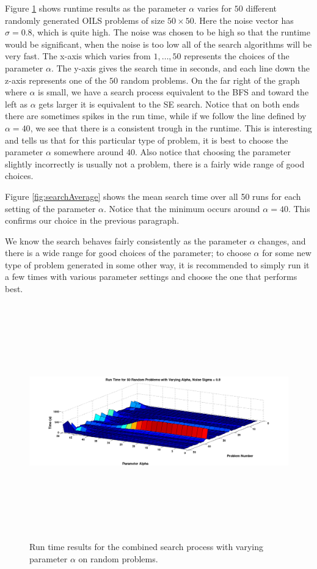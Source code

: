 \documentclass[12pt,Bold,letterpaper]{mcgilletdclass}
\begin{document}
Figure \ref{fig:searchsurface} shows runtime results as the parameter $\alpha$ varies for $50$ different randomly generated OILS problems of size $50 \times 50$. Here the noise vector has $\sigma = 0.8$, which is quite high. The noise was chosen to be high so that the runtime would be significant, when the noise is too low all of the search algorithms will be very fast. The x-axis which varies from $1 , \dots, 50$ represents the choices of the parameter $\alpha$. The y-axis gives the search time in seconds, and each line down the z-axis represents one of the $50$ random problems. On the far right of the graph where $\alpha$ is small, we have a search process equivalent to the BFS and toward the left as $\alpha$ gets larger it is equivalent to the  SE search. Notice that on both ends there are sometimes spikes in the run time, while if we follow the line defined by $\alpha = 40$, we see that there is a consistent trough in the runtime. This is interesting and tells us that for this particular type of problem, it is best to choose the parameter $\alpha$ somewhere around $40$. Also notice that choosing the parameter slightly incorrectly is usually not a problem, there is a fairly wide range of good choices. 

Figure \ref{fig:searchAverage} shows the mean search time over all 50 runs for each setting of the parameter $\alpha$. Notice that the minimum occurs around $\alpha = 40$. This confirms our choice in the previous paragraph.

We know the search behaves fairly consistently as the parameter $\alpha$ changes, and there is a wide range for good choices of the parameter; to choose $\alpha$ for some new type of problem generated in some other way, it is recommended to simply run it a few times with various parameter settings and choose the one that performs best.

\begin{figure}
\centering
\includegraphics[width=6in, height=4in]{searchsurface.png}
\caption{Run time results for the combined search process with varying parameter $\alpha$ on random problems.}
\label{fig:searchsurface}
\end{figure}
\end{document}
